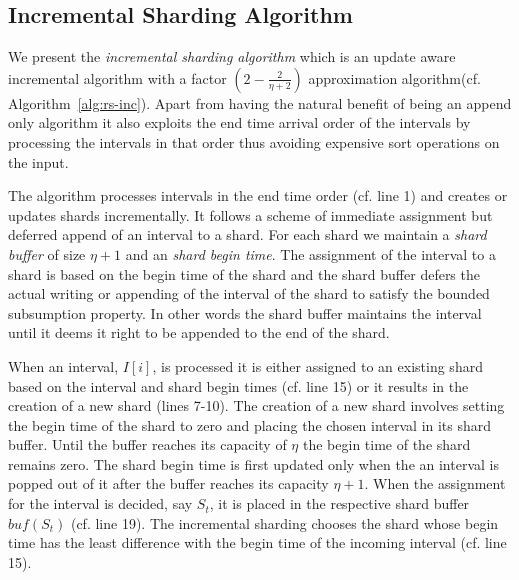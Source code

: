 \subsection{Incremental Sharding Algorithm}

We present the \emph{incremental sharding algorithm} which is an update aware incremental algorithm with a factor $(2  -  \frac{2}{\eta+2})$ approximation algorithm(cf. Algorithm~\ref{alg:rs-inc}). Apart from having the natural benefit of being an append only algorithm it also exploits the end time arrival order of the intervals %
by processing the intervals in that order thus avoiding expensive sort operations on the input. 


The algorithm processes intervals in the end time order (cf. line 1) and creates or updates shards incrementally. It follows a scheme of immediate assignment but deferred append of an interval to a shard. For each shard we maintain a \emph{shard buffer} of size $\eta+1$ and an \emph{shard begin time}. The assignment of the interval to a shard is based on the begin time of the shard and the shard buffer defers the actual writing or appending of the interval of the shard to satisfy the bounded subsumption property. In other words the shard buffer maintains the interval until it deems it right to be appended to the end of the shard.

When an interval, $I[i]$, is processed it is either assigned to an existing shard based on the interval and shard begin times (cf. line 15) or it results in the creation of a new shard (lines 7-10). The creation of a new shard involves setting the begin time of the shard to zero and placing the chosen interval in its shard buffer. Until the buffer reaches its capacity of $\eta$ the begin time of the shard remains zero. The shard begin time is first updated only when the an interval is popped out of it after the buffer reaches its capacity $\eta+1$.  When the assignment for the interval is decided, say $S_t$, it is placed in the respective shard buffer $bu\!f(S_t)$ (cf. line 19). The incremental sharding chooses the shard whose begin time has the least difference with the begin time of the incoming interval (cf. line 15). 

